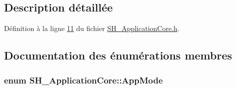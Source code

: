 \subsection{Description détaillée}


Définition à la ligne \hyperlink{SH__ApplicationCore_8h_source_l00011}{11} du fichier \hyperlink{SH__ApplicationCore_8h_source}{S\-H\-\_\-\-Application\-Core.\-h}.



\subsection{Documentation des énumérations membres}
\hypertarget{classSH__ApplicationCore_a6b93b2f83a290305f282616eb2935899}{
\subsubsection[{App\-Mode}]{\setlength{\rightskip}{0pt plus 5cm}enum {\bf S\-H\-\_\-\-Application\-Core\-::\-App\-Mode}}}\label{classSH__ApplicationCore_a6b93b2f83a290305f282616eb2935899}
